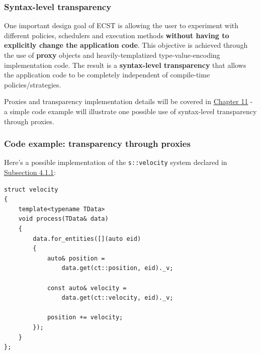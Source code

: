 \documentclass[twoside, 12pt, a4paper, openright]{book}
\begin{document}
\hypertarget{ecstoverview_syntaxtransp}{\subsubsection{Syntax-level
transparency}\label{ecstoverview_syntaxtransp}}

One important design goal of ECST is allowing the user to experiment
with different policies, schedulers and execution methods
\textbf{without having to explicitly change the application code}. This
objective is achieved through the use of \textbf{proxy} objects and
heavily-templatized type-value-encoding implementation code. The result
is a \textbf{syntax-level transparency} that allows the application code
to be completely independent of compile-time policies/strategies.

Proxies and transparency implementation details will be covered in
\protect\hyperlink{chap_proxies}{Chapter 11} - a simple code example
will illustrate one possible use of syntax-level transparency through
proxies.

\subsubsection{Code example: transparency through
proxies}\label{code-example-transparency-through-proxies}

Here's a possible implementation of the
\texttt{s::velocity}
system declared in
\protect\hyperlink{code_example_settings_definition}{Subsection 4.1.1}:

\begin{verbatim}
struct velocity
{
    template<typename TData>
    void process(TData& data)
    {
        data.for_entities([](auto eid)
        {
            auto& position =
                data.get(ct::position, eid)._v;

            const auto& velocity =
                data.get(ct::velocity, eid)._v;

            position += velocity;
        });
    }
};
\end{verbatim}
\end{document}
